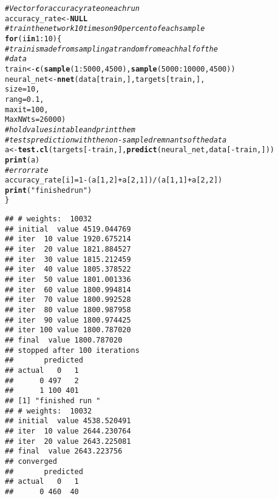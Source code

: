 \documentclass[titlepage]{article}\usepackage[]{graphicx}\usepackage[]{color}
\makeatletter
\newcommand{\hlnum}[1]{\textcolor[rgb]{0.686,0.059,0.569}{#1}}%
\newcommand{\hlstr}[1]{\textcolor[rgb]{0.192,0.494,0.8}{#1}}%
\newcommand{\hlcom}[1]{\textcolor[rgb]{0.678,0.584,0.686}{\textit{#1}}}%
\newcommand{\hlopt}[1]{\textcolor[rgb]{0,0,0}{#1}}%
\newcommand{\hlstd}[1]{\textcolor[rgb]{0.345,0.345,0.345}{#1}}%
\newcommand{\hlkwa}[1]{\textcolor[rgb]{0.161,0.373,0.58}{\textbf{#1}}}%
\newcommand{\hlkwb}[1]{\textcolor[rgb]{0.69,0.353,0.396}{#1}}%
\newcommand{\hlkwc}[1]{\textcolor[rgb]{0.333,0.667,0.333}{#1}}%
\newcommand{\hlkwd}[1]{\textcolor[rgb]{0.737,0.353,0.396}{\textbf{#1}}}%
\newenvironment{kframe}{%
 \def\at@end@of@kframe{}%
 \ifinner\ifhmode%
  \def\at@end@of@kframe{\end{minipage}}%
  \begin{minipage}{\columnwidth}%
 \fi\fi%
 \def\FrameCommand##1{\hskip\@totalleftmargin \hskip-\fboxsep
 \colorbox{shadecolor}{##1}\hskip-\fboxsep
     \hskip-\linewidth \hskip-\@totalleftmargin \hskip\columnwidth}%
 \MakeFramed {\advance\hsize-\width
   \@totalleftmargin\z@ \linewidth\hsize
   \@setminipage}}%
 {\par\unskip\endMakeFramed%
 \at@end@of@kframe}
\newenvironment{knitrout}{}{} %
\makeatother
\begin{document}
\begin{knitrout}
\color{fgcolor}\begin{kframe}
\begin{alltt}
\hlcom{# Vector for accuracy rate on each run}
\hlstd{accuracy_rate} \hlkwb{<-} \hlkwa{NULL}
\hlcom{# train the network 10 times on 90 percent of each sample}
\hlkwa{for} \hlstd{(i} \hlkwa{in} \hlnum{1}\hlopt{:}\hlnum{10}\hlstd{) \{}
  \hlcom{# train is made from sampling at random from each half of the}
  \hlcom{# data}
  \hlstd{train} \hlkwb{<-} \hlkwd{c}\hlstd{(}\hlkwd{sample}\hlstd{(}\hlnum{1}\hlopt{:}\hlnum{5000}\hlstd{,} \hlnum{4500}\hlstd{),} \hlkwd{sample}\hlstd{(}\hlnum{5000}\hlopt{:}\hlnum{10000}\hlstd{,}\hlnum{4500}\hlstd{))}
  \hlstd{neural_net} \hlkwb{<-} \hlkwd{nnet}\hlstd{(data[train,], targets[train,],}
                     \hlkwc{size}\hlstd{=}\hlnum{10}\hlstd{,}
                     \hlkwc{rang} \hlstd{=} \hlnum{0.1}\hlstd{,}
                     \hlkwc{maxit} \hlstd{=}\hlnum{100}\hlstd{,}
                     \hlkwc{MaxNWts} \hlstd{=} \hlnum{26000}\hlstd{)}
  \hlcom{# hold values in table and print them}
  \hlcom{# tests prediction with the non-sampled remnants of the data}
  \hlstd{a} \hlkwb{<-} \hlkwd{test.cl}\hlstd{(targets[}\hlopt{-}\hlstd{train,],} \hlkwd{predict}\hlstd{(neural_net, data[}\hlopt{-}\hlstd{train,]))}
  \hlkwd{print}\hlstd{(a)}
  \hlcom{# error rate}
  \hlstd{accuracy_rate[i]} \hlkwb{=} \hlnum{1}\hlopt{-}\hlstd{(a[}\hlnum{1}\hlstd{,}\hlnum{2}\hlstd{]}\hlopt{+}\hlstd{a[}\hlnum{2}\hlstd{,}\hlnum{1}\hlstd{])} \hlopt{/} \hlstd{(a[}\hlnum{1}\hlstd{,}\hlnum{1}\hlstd{]}\hlopt{+}\hlstd{a[}\hlnum{2}\hlstd{,}\hlnum{2}\hlstd{])}
  \hlkwd{print}\hlstd{(}\hlstr{"finished run "}\hlstd{)}
\hlstd{\}}
\end{alltt}
\begin{verbatim}
## # weights:  10032
## initial  value 4519.044769 
## iter  10 value 1920.675214
## iter  20 value 1821.884527
## iter  30 value 1815.212459
## iter  40 value 1805.378522
## iter  50 value 1801.001336
## iter  60 value 1800.994814
## iter  70 value 1800.992528
## iter  80 value 1800.987958
## iter  90 value 1800.974425
## iter 100 value 1800.787020
## final  value 1800.787020 
## stopped after 100 iterations
##       predicted
## actual   0   1
##      0 497   2
##      1 100 401
## [1] "finished run "
## # weights:  10032
## initial  value 4538.520491 
## iter  10 value 2644.230764
## iter  20 value 2643.225081
## final  value 2643.223756 
## converged
##       predicted
## actual   0   1
##      0 460  40

\end{verbatim}
\end{kframe}
\end{knitrout}
\end{document}
